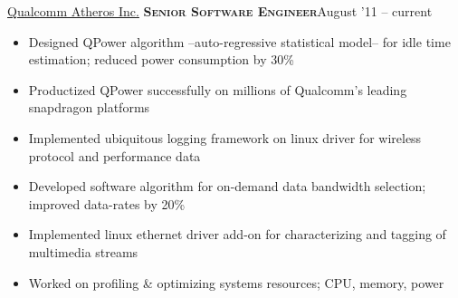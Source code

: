 \documentclass[10pt,a4paper]{article} %
\begin{document}
\vspace{-0.65em}
\headedsection %
{\href{http://www.qca.qualcomm.com}{Qualcomm Atheros Inc.}}
{\textsc{\textbf{Senior Software Engineer}}}{August '11 -- current}
\vspace{-1.0em}
\vspace{-0.2em}
\bodytext
  {\begin{itemize}
	\item Designed QPower algorithm --auto-regressive statistical model-- for idle time estimation; reduced power consumption by 30\% 
	\item Productized QPower successfully on millions of Qualcomm's leading snapdragon platforms
	\item Implemented ubiquitous logging framework on linux driver for wireless protocol and performance data
	\item Developed software algorithm for on-demand data bandwidth selection; improved data-rates by 20\%
	\item Implemented linux ethernet driver add-on for characterizing and tagging of multimedia streams%
	\item Worked on profiling \& optimizing systems resources; CPU, memory, power
\end{itemize}}

%
\end{document}
